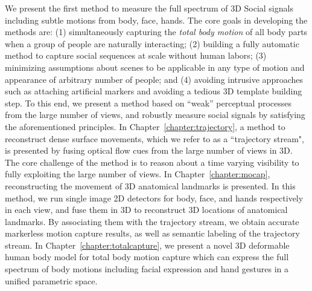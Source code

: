 We present the first method to measure the full spectrum of 3D Social signals including subtle motions from body, face, hands. The core goals in developing the methods are: (1) simultaneously capturing the \emph{total body motion} of all body parts when a group of people are naturally interacting; (2) building a fully automatic method to capture social sequences at scale without human labors; (3) minimizing assumptions about scenes to be applicable in any type of motion and appearance of arbitrary number of people; and (4) avoiding intrusive approaches such as attaching artificial markers and avoiding a tedious 3D template building step. To this end, we present a method based on ``weak'' perceptual processes from the large number of views, and robustly measure social signals by satisfying the aforementioned principles. In Chapter~\ref{chapter:trajectory}, a method to reconstruct dense surface movements, which we refer to as a ``trajectory stream", is presented by fusing optical flow cues from the large number of views in 3D. The core challenge of the method is to reason about a time varying visibility to fully exploiting the large number of views. In Chapter~\ref{chapter:mocap}, reconstructing the movement of 3D anatomical landmarks is presented. In this method, we run single image 2D detectors for body, face, and hands respectively in each view, and fuse them in 3D to reconstruct 3D locations of anatomical landmarks. By associating them with the trajectory stream, we obtain accurate markerless motion capture results, as well as semantic labeling of the trajectory stream.  In Chapter~\ref{chapter:totalcapture}, we present a novel 3D deformable human body model for total body motion capture which can express the full spectrum of body motions including facial expression and hand gestures in a unified parametric space. 


	



